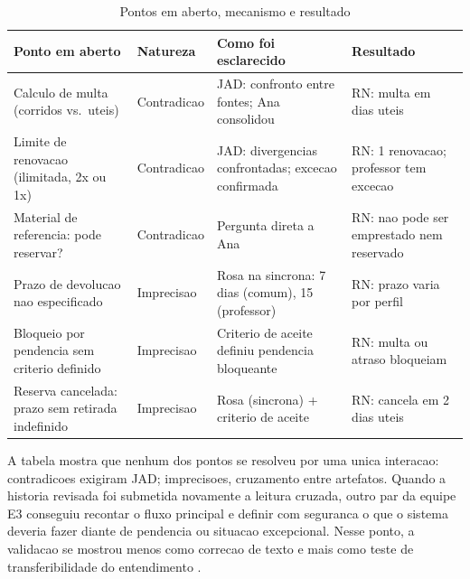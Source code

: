 ﻿\documentclass[12pt]{article}
\begin{document}
\begin{table}[ht]
\centering
\caption{Pontos em aberto, mecanismo e resultado}
\label{tab:levantamento}
\scriptsize
\setlength{\tabcolsep}{2.5pt}
\renewcommand{\arraystretch}{0.92}
\begin{tabular}{p{2.45cm}p{1.55cm}p{4.05cm}p{4.0cm}}
\hline
\textbf{Ponto em aberto} & \textbf{Natureza} & \textbf{Como foi esclarecido} & \textbf{Resultado} \\
\hline
Calculo de multa (corridos vs.\ uteis) &
  Contradicao &
  JAD: confronto entre fontes; Ana consolidou &
  RN: multa em dias uteis \\
\hline
Limite de renovacao (ilimitada, 2x ou 1x) &
  Contradicao &
  JAD: divergencias confrontadas; excecao confirmada &
  RN: 1 renovacao; professor tem excecao \\
\hline
Material de referencia: pode reservar? &
  Contradicao &
  Pergunta direta a Ana &
  RN: nao pode ser emprestado nem reservado \\
\hline
Prazo de devolucao nao especificado &
  Imprecisao &
  Rosa na sincrona: 7 dias (comum), 15 (professor) &
  RN: prazo varia por perfil \\
\hline
Bloqueio por pendencia sem criterio definido &
  Imprecisao &
  Criterio de aceite definiu pendencia bloqueante &
  RN: multa ou atraso bloqueiam \\
\hline
Reserva cancelada: prazo sem retirada indefinido &
  Imprecisao &
  Rosa (sincrona) + criterio de aceite &
  RN: cancela em 2 dias uteis \\
\hline
\end{tabular}
\end{table}

A tabela mostra que nenhum dos pontos se resolveu por uma unica interacao: contradicoes exigiram JAD; imprecisoes, cruzamento entre artefatos. Quando a historia revisada foi submetida novamente a leitura cruzada, outro par da equipe E3 conseguiu recontar o fluxo principal e definir com seguranca o que o sistema deveria fazer diante de pendencia ou situacao excepcional. Nesse ponto, a validacao se mostrou menos como correcao de texto e mais como teste de transferibilidade do entendimento \cite{sakthivel1991verification,lucassen2016qus}.
\end{document}

